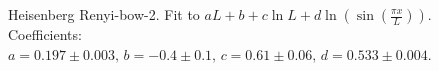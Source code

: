 \documentclass[prl,aps,twocolumn,floatfix,amsmath,amssymb,superscriptaddress,tightenlines]{revtex4}
\begin{document}
\begin{figure}[h]
  \begin{center}
  \end{center}
  \caption{Heisenberg Renyi-bow-2. Fit to $a L + b + c \ln L + d \ln \left( \sin \left( \frac{\pi x}{L} \right) \right).$ Coefficients: $a = 0.197\pm 0.003, \, b = -0.4 \pm 0.1, \, c = 0.61\pm 0.06, \, d = 0.533 \pm 0.004$.}
  \label{fig:4}
\end{figure}


\end{document}
